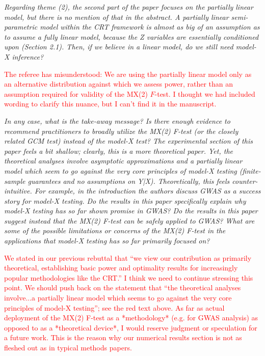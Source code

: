 \documentclass[12pt]{article}
\begin{document}
\textsl{Regarding theme (2), the second part of the paper focuses on the partially linear model, but there is no mention of that in the abstract. A partially linear semi-parametric model within the CRT framework is almost as big of an assumption as to assume a fully linear model, because the Z variables are essentially conditioned upon (Section 2.1). Then, if we believe in a linear model, do we still need model-X inference?}

\textcolor{red}{The referee has misunderstood: We are using the partially linear model only as an alternative distribution against which we assess power, rather than an assumption required for validity of the MX(2) $F$-test. I thought we had included wording to clarify this nuance, but I can't find it in the manuscript.}

\textsl{In any case, what is the take-away message? Is there enough evidence to recommend practitioners to broadly utilize the MX(2) F-test (or the closely related GCM test) instead of the model-X test? The experimental section of this paper feels a bit shallow; clearly, this is a more theoretical paper. Yet, the theoretical analyses involve asymptotic approximations and a partially linear model which seem to go against the very core principles of model-X testing (finite-sample guarantees and no assumptions on Y|X). Theoretically, this feels counter-intuitive. For example, in the introduction the authors discuss GWAS as a success story for model-X testing. Do the results in this paper specifically explain why model-X testing has so far shown promise in GWAS? Do the results in this paper suggest instead that the MX(2) F-test can be safely applied to GWAS? What are some of the possible limitations or concerns of the MX(2) F-test in the applications that model-X testing has so far primarily focused on?}

\textcolor{red}{We stated in our previous rebuttal that ``we view our contribution as primarily theoretical, establishing basic power and optimality results for increasingly popular methodologies like the CRT.'' I think we need to continue stressing this point. We should push back on the statement that ``the theoretical analyses involve...a partially linear model which seems to go against the very core principles of model-X testing''; see the red text above. As far as actual deployment of the MX(2) F-test as a *methodology* (e.g. for GWAS analysis) as opposed to as a *theoretical device*, I would reserve judgment or speculation for a future work. This is the reason why our numerical results section is not as fleshed out as in typical methods papers.}
\end{document}
